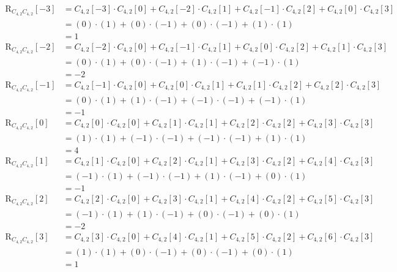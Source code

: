 \begin{solution}
\begin{tasks}
{			\begin{equation*}
			\begin{split}
			\mathrm{R}_{C_{4,2}C_{4,2}}[-3] &= C_{4,2}[-3] \cdot C_{4,2}[0] + C_{4,2}[-2] \cdot C_{4,2}[1] + C_{4,2}[-1] \cdot C_{4,2}[2] + C_{4,2}[0] \cdot C_{4,2}[3] \\
			&= (0) \cdot (1) + (0) \cdot (-1) + (0) \cdot (-1) + (1) \cdot (1) \\
			&= 1 \\
			\mathrm{R}_{C_{4,2}C_{4,2}}[-2] &= C_{4,2}[-2] \cdot C_{4,2}[0] + C_{4,2}[-1] \cdot C_{4,2}[1] + C_{4,2}[0] \cdot C_{4,2}[2] + C_{4,2}[1] \cdot C_{4,2}[3] \\
			&= (0) \cdot (1) + (0) \cdot (-1) + (1) \cdot (-1) + (-1) \cdot (1) \\
			&= -2 \\
			\mathrm{R}_{C_{4,2}C_{4,2}}[-1] &= C_{4,2}[-1] \cdot C_{4,2}[0] + C_{4,2}[0] \cdot C_{4,2}[1] + C_{4,2}[1] \cdot C_{4,2}[2] + C_{4,2}[2] \cdot C_{4,2}[3] \\
			&= (0) \cdot (1) + (1) \cdot (-1) + (-1) \cdot (-1) + (-1) \cdot (1) \\
			&= -1 \\
			\mathrm{R}_{C_{4,2}C_{4,2}}[0] &= C_{4,2}[0] \cdot C_{4,2}[0] + C_{4,2}[1] \cdot C_{4,2}[1] + C_{4,2}[2] \cdot C_{4,2}[2] + C_{4,2}[3] \cdot C_{4,2}[3] \\
			&= (1) \cdot (1) + (-1) \cdot (-1) + (-1) \cdot (-1) + (1) \cdot (1) \\
			&= 4 \\
			\mathrm{R}_{C_{4,2}C_{4,2}}[1] &= C_{4,2}[1] \cdot C_{4,2}[0] + C_{4,2}[2] \cdot C_{4,2}[1] + C_{4,2}[3] \cdot C_{4,2}[2] + C_{4,2}[4] \cdot C_{4,2}[3] \\
			&= (-1) \cdot (1) + (-1) \cdot (-1) + (1) \cdot (-1) + (0) \cdot (1) \\
			&= -1 \\
			\mathrm{R}_{C_{4,2}C_{4,2}}[2] &= C_{4,2}[2] \cdot C_{4,2}[0] + C_{4,2}[3] \cdot C_{4,2}[1] + C_{4,2}[4] \cdot C_{4,2}[2] + C_{4,2}[5] \cdot C_{4,2}[3] \\
			&= (-1) \cdot (1) + (1) \cdot (-1) + (0) \cdot (-1) + (0) \cdot (1) \\
			&= -2 \\
			\mathrm{R}_{C_{4,2}C_{4,2}}[3] &= C_{4,2}[3] \cdot C_{4,2}[0] + C_{4,2}[4] \cdot C_{4,2}[1] + C_{4,2}[5] \cdot C_{4,2}[2] + C_{4,2}[6] \cdot C_{4,2}[3] \\
			&= (1) \cdot (1) + (0) \cdot (-1) + (0) \cdot (-1) + (0) \cdot (1) \\
			&= 1 \\
			\end{split}
			\end{equation*}
		}
	\end{tasks}
\end{solution}

